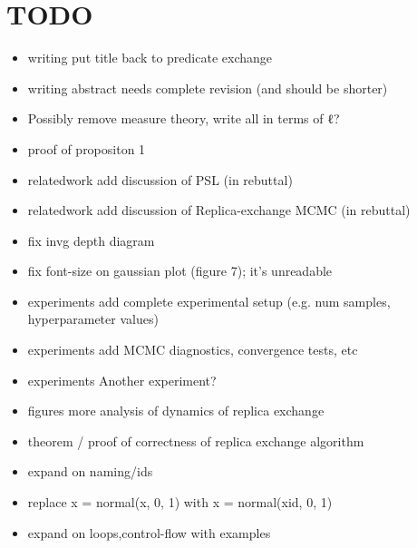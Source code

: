 \section{TODO}
\begin{itemize}
\item {writing} put title back to predicate exchange
\item {writing} abstract needs complete revision (and should be shorter)
\item Possibly remove measure theory, write all in terms of ℓ?
\item proof of propositon 1
\item {relatedwork} add discussion of PSL (in rebuttal)
\item {relatedwork} add discussion of Replica-exchange MCMC (in rebuttal)
\item fix invg depth diagram
\item fix font-size on gaussian plot (figure 7); it's unreadable 
\item {experiments} add complete experimental setup (e.g. num samples, hyperparameter values)
\item {experiments} add MCMC diagnostics, convergence tests, etc
\item {experiments} Another experiment?
\item {figures} more analysis of dynamics of replica exchange
\item theorem / proof of correctness of replica exchange algorithm
\item expand on naming/ids
\item replace x = normal(x, 0, 1) with x = normal(xid, 0, 1)
\item expand on loops,control-flow with examples
\end{itemize}

\newpage